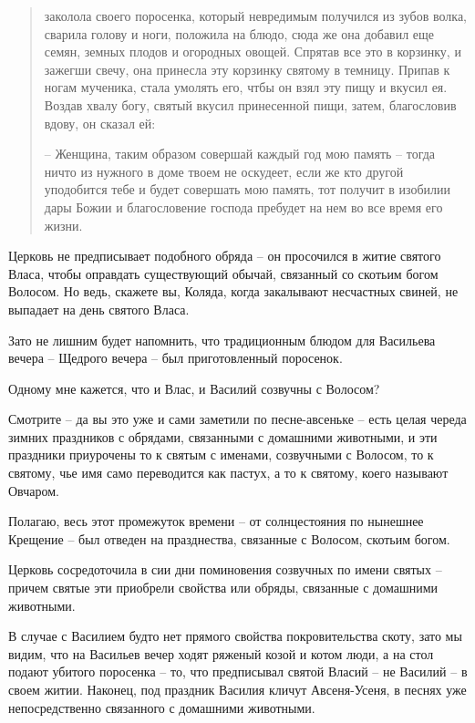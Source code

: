 \documentclass[a5paper,11pt,openany]{article}
\begin{document}
\begin{quotation}
\noindent заколола своего поросенка, который невредимым получился из зубов волка, сварила голову и ноги, положила на блюдо, сюда же она добавил еще семян, земных плодов и огородных овощей. Спрятав все это в корзинку, и зажегши свечу, она принесла эту корзинку святому в темницу. Припав к ногам мученика, стала умолять его, чтбы он взял эту пищу и вкусил ея. Воздав хвалу богу, святый вкусил принесенной пищи, затем, благословив вдову, он сказал ей:

 – Женщина, таким образом совершай каждый год мою память – тогда ничто из нужного в доме твоем не оскудеет, если же кто другой уподобится тебе и будет совершать мою память, тот получит в изобилии дары Божии и благословение господа пребудет на нем во все время его жизни.
\end{quotation}

   Церковь не предписывает подобного обряда – он просочился в житие святого Власа, чтобы оправдать существующий обычай, связанный со скотьим богом Волосом. Но ведь, скажете вы, Коляда, когда закалывают несчастных свиней, не выпадает на день святого Власа.

  Зато не лишним будет напомнить, что традиционным блюдом для Васильева вечера – Щедрого вечера – был приготовленный поросенок.

 Одному мне кажется, что и Влас, и Василий созвучны с Волосом?

  Смотрите – да вы это уже и сами заметили по песне-авсеньке – есть целая череда зимних праздников с обрядами, связанными с домашними животными, и эти праздники приурочены то к святым с именами, созвучными с Волосом, то к святому, чье имя само переводится как пастух, а то к святому, коего называют Овчаром.

   Полагаю, весь этот промежуток времени – от солнцестояния по нынешнее Крещение – был отведен на празднества, связанные с Волосом, скотьим богом.

   Церковь сосредоточила в сии дни поминовения созвучных по имени святых – причем святые эти приобрели свойства или обряды, связанные с домашними животными.

   В случае с Василием будто нет прямого свойства покровительства скоту, зато мы видим, что на Васильев вечер ходят ряженый козой и котом люди, а на стол подают убитого поросенка – то, что предписывал святой Власий – не Василий – в своем житии. Наконец, под праздник Василия кличут Авсеня-Усеня, в песнях уже непосредственно связанного с домашними животными.
\end{document}
